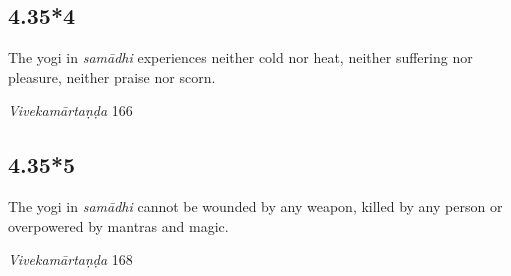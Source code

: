 \begin{ekdosis}

\subsection*{4.35*4}
\begin{translation}[hp04_035_4]
The yogi in \textit{samādhi} experiences neither cold nor heat, neither suffering nor pleasure, neither praise nor scorn.
\end{translation}

\begin{sources}[hp04_035_4]
\emph{Vivekamārtaṇḍa} 166
\begin{versinnote}
\end{versinnote}
\end{sources}



\subsection*{4.35*5}
\begin{translation}[hp04_035_5]
The yogi in \textit{samādhi} cannot be wounded by any weapon, killed by any person or overpowered by mantras and magic.
\end{translation}


\begin{sources}[hp04_035_5]
\emph{Vivekamārtaṇḍa} 168
\begin{versinnote}
\end{versinnote}
\end{sources}



\end{ekdosis}
